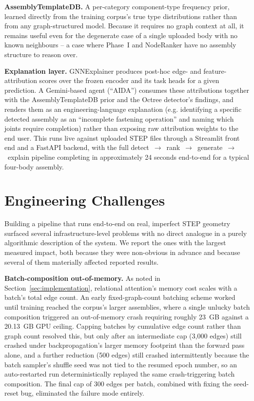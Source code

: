 \documentclass[sn-mathphys,Numbered]{sn-jnl}
\begin{document}
\textbf{AssemblyTemplateDB.} A per-category component-type frequency prior, learned directly from the training corpus's true type distributions rather than from any graph-structured model. Because it requires no graph context at all, it remains useful even for the degenerate case of a single uploaded body with no known neighbours -- a case where Phase~I and NodeRanker have no assembly structure to reason over.

\textbf{Explanation layer.} GNNExplainer \cite{ying2019gnnexplainer} produces post-hoc edge- and feature-attribution scores over the frozen encoder and its task heads for a given prediction. A Gemini-based agent (``AIDA'') consumes these attributions together with the AssemblyTemplateDB prior and the Octree detector's findings, and renders them as an engineering-language explanation (e.g. identifying a specific detected assembly as an ``incomplete fastening operation'' and naming which joints require completion) rather than exposing raw attribution weights to the end user. This runs live against uploaded STEP files through a Streamlit front end and a FastAPI backend, with the full detect~$\to$~rank~$\to$~generate~$\to$~explain pipeline completing in approximately 24 seconds end-to-end for a typical four-body assembly.

\section{Engineering Challenges}\label{sec:engineering}

Building a pipeline that runs end-to-end on real, imperfect STEP geometry surfaced several infrastructure-level problems with no direct analogue in a purely algorithmic description of the system. We report the ones with the largest measured impact, both because they were non-obvious in advance and because several of them materially affected reported results.

\textbf{Batch-composition out-of-memory.} As noted in Section~\ref{sec:implementation}, relational attention's memory cost scales with a batch's total edge count. An early fixed-graph-count batching scheme worked until training reached the corpus's larger assemblies, where a single unlucky batch composition triggered an out-of-memory crash requiring roughly 23~GB against a 20.13~GB GPU ceiling. Capping batches by cumulative edge count rather than graph count resolved this, but only after an intermediate cap (3{,}000 edges) still crashed under backpropagation's larger memory footprint than the forward pass alone, and a further reduction (500 edges) still crashed intermittently because the batch sampler's shuffle seed was not tied to the resumed epoch number, so an auto-restarted run deterministically replayed the same crash-triggering batch composition. The final cap of 300 edges per batch, combined with fixing the seed-reset bug, eliminated the failure mode entirely.
\end{document}
